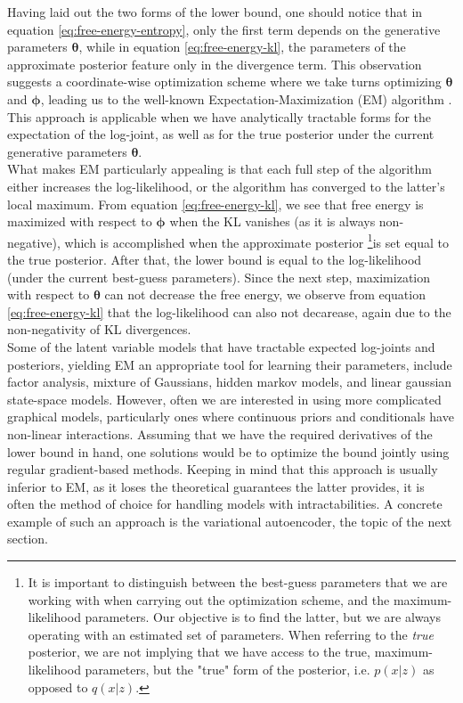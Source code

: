 \documentclass{report}
\begin{document}
\noindent Having laid out the two forms of the lower bound, one should notice that in equation \ref{eq:free-energy-entropy}, only the first term depends on the generative parameters $\boldsymbol{\theta}$, while in equation \ref{eq:free-energy-kl}, the parameters of the approximate posterior feature only in the divergence term. This observation suggests a coordinate-wise optimization scheme where we take turns optimizing $\boldsymbol{\theta}$ and $\boldsymbol{\phi}$, leading us to the well-known Expectation-Maximization (EM) algorithm \cite{missing-data}. This approach is applicable when we have analytically tractable forms for the expectation of the log-joint, as well as for the true posterior under the current generative parameters $\boldsymbol{\theta}$. \\


\noindent What makes EM particularly appealing is that each full step of the algorithm either increases the log-likelihood, or the algorithm has converged to the latter's local maximum. From equation \ref{eq:free-energy-kl}, we see that free energy is maximized with respect to $\boldsymbol{\phi}$ when the KL vanishes (as it is always non-negative), which is accomplished when the approximate posterior \footnote{It is important to distinguish between the best-guess parameters that we are working with when carrying out the optimization scheme, and the maximum-likelihood parameters. Our objective is to find the latter, but we are always operating with an estimated set of parameters. When referring to the \textit{true} posterior, we are not implying that we have access to the true, maximum-likelihood parameters, but the "true" form of the posterior, i.e. $p(x|z)$ as opposed to $q(x|z)$.}is set equal to the true posterior. After that, the lower bound is equal to the log-likelihood (under the current best-guess parameters). Since the next step, maximization with respect to $\boldsymbol{\theta}$ can not decrease the free energy, we observe from equation \ref{eq:free-energy-kl} that the log-likelihood can also not decarease, again due to the non-negativity of KL divergences. \\

\noindent Some of the latent variable models that have tractable expected log-joints and posteriors, yielding EM an appropriate tool for learning their parameters, include factor analysis, mixture of Gaussians, hidden markov models, and linear gaussian state-space models. However, often we are interested in using more complicated graphical models, particularly ones where continuous priors and conditionals have non-linear interactions. Assuming that we have the required derivatives of the lower bound in hand, one solutions would be to optimize the bound jointly using regular gradient-based methods. Keeping in mind that this approach is usually inferior to EM, as it loses the theoretical guarantees the latter provides, it is often the method of choice for handling models with intractabilities. A concrete example of such an approach is the variational autoencoder, the topic of the next section.
\end{document}
